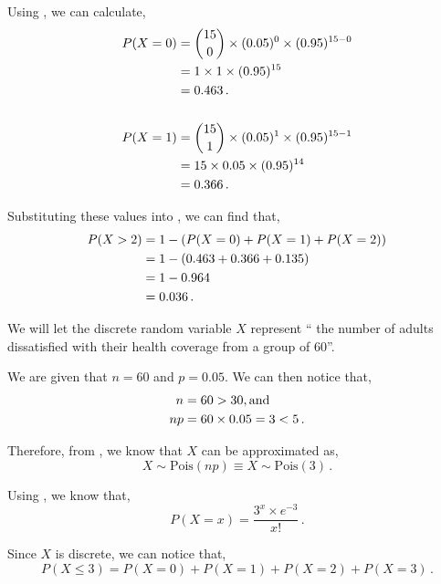 \begin{subquestions}
\begin{subsubquestions}
\begin{subsubsubquestions}
Using , we can calculate,
\begin{align}
	P(X=0) & = { 15 \choose 0} \times (0.05)^0 \times (0.95)^{15-0} \nonumber \\
	       & = 1 \times 1 \times (0.95)^{15} \nonumber \\
	       & = 0.463 \,. \\ \nonumber \\
	P(X=1) & = { 15 \choose 1} \times (0.05)^1 \times (0.95)^{15-1} \nonumber \\
	       & = 15 \times 0.05 \times (0.95)^{14} \nonumber \\
	       & = 0.366 \,. 
\end{align}

Substituting these values into , we can find that,       
\begin{align}
	P(X>2) & = 1 - (P(X=0)+P(X=1)+P(X=2)) \nonumber \\
	       & = 1 - (0.463+0.366+0.135) \nonumber \\
	       & = 1 - 0.964 \nonumber \\
	       & = 0.036 \,. 
\end{align}

\end{subsubsubquestions}


\subsubquestion

We will let the discrete random variable $X$ represent `` the number of adults dissatisfied with their health coverage from a group of 60''.
 
We are given that $n=60$ and $p=0.05$. We can then notice that,
\begin{align}
	n=60 & >30, \text{and} \nonumber \\
	np = 60 & \times 0.05 = 3 < 5 \,.
\end{align}

Therefore, from , we know that $X$ can be approximated as,
\begin{equation}
	X \sim \text{Pois}(np) \equiv X \sim \text{Pois}(3) \,.
\end{equation}

Using , we know that,
\begin{equation}
	P(X = x) =\frac{ 3 ^ x \times e^{-3}}{x!} \,. \label{2005:q4:Pois1}
\end{equation}

Since $X$ is discrete, we can notice that,
\begin{equation}
	P(X \leq 3) = P(X=0)+P(X=1)+P(X=2)+P(X=3) \,. \label{2005:q4:DisPois}
\end{equation}


\end{subsubquestions}
\end{subquestions}
